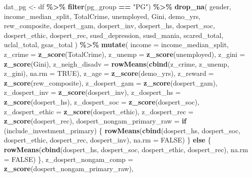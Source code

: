 \documentclass[
]{article}
\newenvironment{Shaded}{\begin{snugshade}}{\end{snugshade}}
\newcommand{\AttributeTok}[1]{\textcolor[rgb]{0.13,0.29,0.53}{#1}}
\newcommand{\ConstantTok}[1]{\textcolor[rgb]{0.56,0.35,0.01}{#1}}
\newcommand{\ControlFlowTok}[1]{\textcolor[rgb]{0.13,0.29,0.53}{\textbf{#1}}}
\newcommand{\FunctionTok}[1]{\textcolor[rgb]{0.13,0.29,0.53}{\textbf{#1}}}
\newcommand{\NormalTok}[1]{#1}
\newcommand{\OtherTok}[1]{\textcolor[rgb]{0.56,0.35,0.01}{#1}}
\newcommand{\SpecialCharTok}[1]{\textcolor[rgb]{0.81,0.36,0.00}{\textbf{#1}}}
\newcommand{\StringTok}[1]{\textcolor[rgb]{0.31,0.60,0.02}{#1}}
\begin{document}
\begin{Shaded}
\begin{Highlighting}[]
\NormalTok{dat\_pg }\OtherTok{\textless{}{-}}\NormalTok{ df }\SpecialCharTok{\%\textgreater{}\%}
  \FunctionTok{filter}\NormalTok{(pg\_group }\SpecialCharTok{==} \StringTok{"PG"}\NormalTok{) }\SpecialCharTok{\%\textgreater{}\%}
  \FunctionTok{drop\_na}\NormalTok{(}
\NormalTok{    gender, income\_median\_split,}
\NormalTok{    TotalCrime, unemployed, Gini,}
\NormalTok{    demo\_yrs,}
\NormalTok{    rew\_composite,}
\NormalTok{    dospert\_gam, dospert\_inv, dospert\_hs, dospert\_soc, dospert\_ethic, dospert\_rec,}
\NormalTok{    susd\_depression, susd\_mania, scared\_total, uclal\_total,}
\NormalTok{    gsas\_total}
\NormalTok{  ) }\SpecialCharTok{\%\textgreater{}\%}
  \FunctionTok{mutate}\NormalTok{(}
    \AttributeTok{income =}\NormalTok{ income\_median\_split,}
    \AttributeTok{z\_crime =} \FunctionTok{z\_score}\NormalTok{(TotalCrime),}
    \AttributeTok{z\_unemp =} \FunctionTok{z\_score}\NormalTok{(unemployed),}
    \AttributeTok{z\_gini  =} \FunctionTok{z\_score}\NormalTok{(Gini),}
    \AttributeTok{z\_neigh\_disadv =} \FunctionTok{rowMeans}\NormalTok{(}\FunctionTok{cbind}\NormalTok{(z\_crime, z\_unemp, z\_gini), }\AttributeTok{na.rm =} \ConstantTok{TRUE}\NormalTok{),}
    \AttributeTok{z\_age =} \FunctionTok{z\_score}\NormalTok{(demo\_yrs),}
    \AttributeTok{z\_reward =} \FunctionTok{z\_score}\NormalTok{(rew\_composite),}
    \AttributeTok{z\_dospert\_gam   =} \FunctionTok{z\_score}\NormalTok{(dospert\_gam),}
    \AttributeTok{z\_dospert\_inv   =} \FunctionTok{z\_score}\NormalTok{(dospert\_inv),}
    \AttributeTok{z\_dospert\_hs    =} \FunctionTok{z\_score}\NormalTok{(dospert\_hs),}
    \AttributeTok{z\_dospert\_soc   =} \FunctionTok{z\_score}\NormalTok{(dospert\_soc),}
    \AttributeTok{z\_dospert\_ethic =} \FunctionTok{z\_score}\NormalTok{(dospert\_ethic),}
    \AttributeTok{z\_dospert\_rec   =} \FunctionTok{z\_score}\NormalTok{(dospert\_rec),}
    \AttributeTok{dospert\_nongam\_primary\_raw =} \ControlFlowTok{if}\NormalTok{ (include\_investment\_primary) \{}
      \FunctionTok{rowMeans}\NormalTok{(}\FunctionTok{cbind}\NormalTok{(dospert\_hs, dospert\_soc, dospert\_ethic, dospert\_rec, dospert\_inv), }\AttributeTok{na.rm =} \ConstantTok{FALSE}\NormalTok{)}
\NormalTok{    \} }\ControlFlowTok{else}\NormalTok{ \{}
      \FunctionTok{rowMeans}\NormalTok{(}\FunctionTok{cbind}\NormalTok{(dospert\_hs, dospert\_soc, dospert\_ethic, dospert\_rec), }\AttributeTok{na.rm =} \ConstantTok{FALSE}\NormalTok{)}
\NormalTok{    \},}
    \AttributeTok{z\_dospert\_nongam\_comp =} \FunctionTok{z\_score}\NormalTok{(dospert\_nongam\_primary\_raw),}

\end{Highlighting}
\end{Shaded}
\end{document}
